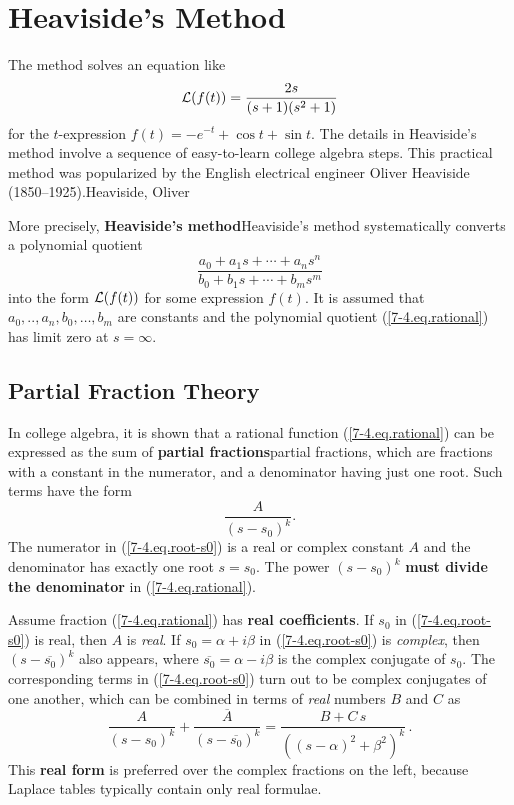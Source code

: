 \documentclass{article}
\def\df{\bfseries}
\def\dd{\displaystyle}
\def\Ll{{\cal L}}
\def\DF#1{{\df #1}\XX{#1}}
\def\BF#1{{\df #1}}
\def\XX{}
\def\rf#1{(\ref{#1})}
\def\EM#1{{\mdseries\itshape #1}}
\begin{document}
%
\section{Heaviside's Method}
\label{partial-fractions} The method solves an equation like
$$\Ll(f(t))={\dd\frac{2s}{(s+1)(s^2+1)}}$$
for the $t$-expression $f(t)=-e^{-t}+\cos t + \sin t$. The details
in Heaviside's method involve a sequence of easy-to-learn college
algebra steps. This practical method was popularized by the
English electrical engineer Oliver Heaviside
(1850--1925).\XX{Heaviside, Oliver}

More precisely, \DF{Heaviside's method} systematically converts a
polynomial quotient
\begin{equation}\label{7-4.eq.rational}
 \frac{a_0+a_1s+\cdots + a_ns^n}{b_0+b_1s+\cdots+b_ms^m}
\end{equation}
into the form $\Ll(f(t))$ for some expression $f(t)$.  It is
assumed that $a_0,..,a_n,b_0,\ldots,b_m$ are constants and the
polynomial quotient \rf{7-4.eq.rational} has limit zero at
$s=\infty$.

\subsection{Partial Fraction Theory}
\def\thesectiontitle{Partial fractions}
In college algebra, it is shown that a rational function
\rf{7-4.eq.rational} can be expressed as the sum of \DF{partial
fractions}, which are fractions with a constant in the numerator,
and a denominator having just one root. Such terms have the form
\begin{equation}\label{7-4.eq.root-s0}
\frac{A}{(s-s_0)^k}.
\end{equation}
The numerator in \rf{7-4.eq.root-s0} is a real or complex constant
$A$ and the denominator has exactly one root $s=s_0$. The power
$(s-s_0)^k$ \BF{must divide the denominator} in
\rf{7-4.eq.rational}.

Assume fraction \rf{7-4.eq.rational} has \BF{real coefficients}.
If $s_0$ in \rf{7-4.eq.root-s0} is real, then $A$
is \EM{real}. If $s_0=\alpha+i\beta$ in \rf{7-4.eq.root-s0} is
\EM{complex}, then $(s-\overline{s_0})^k$ also appears, where
$\overline{s_0}=\alpha-i\beta$ is the complex conjugate of $s_0$.
The corresponding terms in \rf{7-4.eq.root-s0} turn out to be complex
conjugates of one another, which can be combined in terms of \EM{real}
numbers $B$ and $C$ as
\begin{equation}\label{7-4.eq.root-alpha-beta}
\frac{A}{(s-s_0)^k}+\frac{\overline{\!A}}{(s-\overline{s_0})^k}=
\frac{B+C\,s}{((s-\alpha)^2+\beta^2)^k}\,.
\end{equation}
This \BF{real form} is preferred over the complex fractions on the
left, because Laplace tables typically contain only real formulae.
\end{document}
